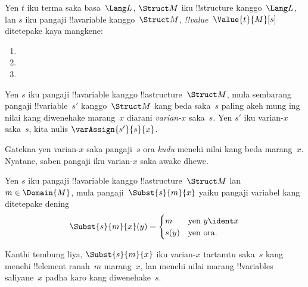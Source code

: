 \documentclass[../../../include/open-logic-section]{subfiles}
\begin{document}
\begin{defn}
Yen $t$ iku terma saka basa~$\Lang L$, $\Struct M$ iku
!!{structure} kanggo~$\Lang L$, lan $s$ iku pangaji !!a{variable}
kanggo~$\Struct M$, \emph{!!{value}}~$\Value{t}{M}[s]$
ditetepake kaya mangkene:
\begin{enumerate}
\item {}
\item {}
\item {}
\end{enumerate}
\end{defn}

\begin{defn}[Varian-$x$]
Yen $s$ iku pangaji !!a{variable} kanggo !!a{structure}~$\Struct M$,
mula sembarang pangaji !!{variable}~$s'$ kanggo~$\Struct M$
kang beda saka~$s$ paling akeh mung ing nilai kang diwenehake
marang~$x$ diarani \emph{varian-$x$} saka~$s$. Yen $s'$ iku
varian-$x$ saka~$s$, kita nulis $\varAssign{s'}{s}{x}$.
\end{defn}

\begin{explain}
Gatekna yen varian-$x$ saka pangaji~$s$ ora \emph{kudu}
menehi nilai kang beda marang~$x$. Nyatane, saben pangaji
iku varian-$x$ saka awake dhewe.
\end{explain}

\begin{defn}
  Yen $s$ iku pangaji !!a{variable} kanggo !!a{structure}~$\Struct M$
  lan $m \in \Domain{M}$, mula pangaji~$\Subst{s}{m}{x}$
  yaiku pangaji variabel kang ditetepake dening
  \[\Subst{s}{m}{x}(y) = \begin{cases}
    m & \text{yen } y \ident x\\
    s(y) & \text{yen ora}.
  \end{cases}\]
\end{defn}

Kanthi tembung liya, $\Subst{s}{m}{x}$ iku varian-$x$
tartamtu saka~$s$ kang menehi !!{element} ranah~$m$ marang~$x$,
lan menehi nilai marang !!{variable}s saliyane~$x$
padha karo kang diwenehake~$s$.
\end{document}
